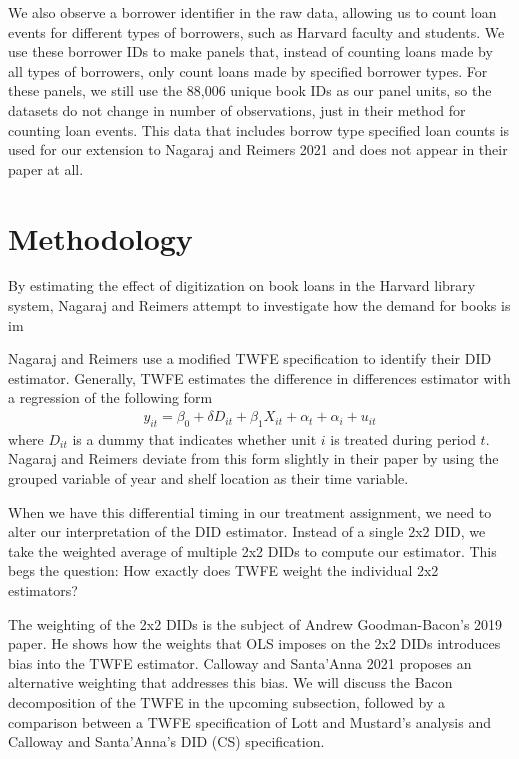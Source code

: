 \documentclass{article}
\begin{document}
We also observe a borrower identifier in the raw data, allowing us to count loan events for different types of borrowers, such as Harvard faculty and students. We use these borrower IDs to make panels that, instead of counting loans made by all types of borrowers, only count loans made by specified borrower types. For these panels, we still use the 88,006 unique book IDs as our panel units, so the datasets do not change in number of observations, just in their method for counting loan events. This data that includes borrow type specified loan counts is used for our extension to Nagaraj and Reimers 2021 and does not appear in their paper at all. 
\section{Methodology}
By estimating the effect of digitization on book loans in the Harvard library system, Nagaraj and Reimers attempt to investigate how the demand for books is im

Nagaraj and Reimers use a modified TWFE specification to identify their DID estimator.  Generally, TWFE estimates the difference in differences estimator with a regression of the following form
\begin{align}
	y_{it} = \beta_0 + \delta D_{it} + \beta_1X_{it} + \alpha_t  +  \alpha_i + u_{it}
\end{align}
where $D_{it}$ is a dummy that indicates whether unit $i$ is treated during period $t$. Nagaraj and Reimers deviate from this form slightly in their paper by using the grouped variable of year and shelf location as their time variable. 

When we have this differential timing in our treatment assignment, we need to alter our interpretation of the DID estimator. Instead of a single 2x2 DID, we take the weighted average of multiple 2x2 DIDs to compute our estimator. This begs the question: How exactly does TWFE weight the individual 2x2 estimators? 

The weighting of the 2x2 DIDs is the subject of Andrew Goodman-Bacon's 2019 paper. He shows how the weights that OLS imposes on the 2x2 DIDs introduces bias into the TWFE estimator. Calloway and Santa'Anna 2021 proposes an alternative weighting that addresses this bias. We will discuss the Bacon decomposition of the TWFE in the upcoming subsection, followed by a comparison between a TWFE specification of Lott and Mustard's analysis and Calloway and Santa'Anna's DID (CS) specification. 


\end{document}
